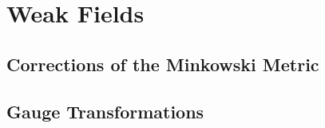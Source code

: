 \setchapterpreamble[u]{\margintoc}
\chapter{Weak Fields}

\section{Corrections of the Minkowski Metric}

\section{Gauge Transformations}